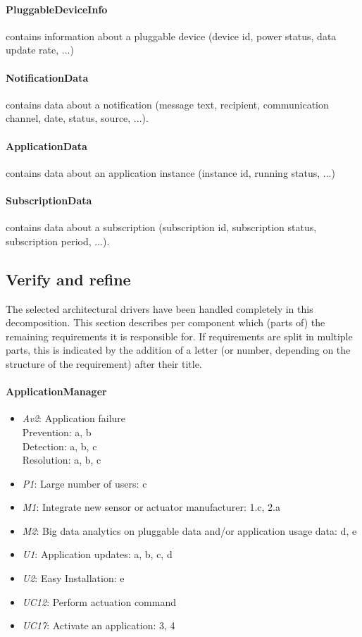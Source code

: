     \paragraph{PluggableDeviceInfo}
               contains information about a pluggable device (device id,
               power status, data update rate, ...)
    \paragraph{NotificationData}
               contains data about a notification (message text, recipient,
               communication channel, date, status, source, ...).
    \paragraph{ApplicationData}
               contains data about an application instance (instance id, running status, ...)
    \paragraph{SubscriptionData}
               contains data about a subscription (subscription id, subscription status,
               subscription period, ...).


\subsection{Verify and refine}
    \noindent The selected architectural drivers have been handled completely
    in this decomposition.
    This section describes per component which (parts of) the remaining
    requirements it is responsible for. If requirements are split in
    multiple parts, this is indicated by the addition of a letter
    (or number, depending on the structure of the requirement) after their title.

    \paragraph{ApplicationManager}
        \begin{itemize}
            \item \emph{Av2}: Application failure \\
                   Prevention: a, b \\
                   Detection: a, b, c \\
                   Resolution: a, b, c
           \item \emph{P1}: Large number of users: c
           \item \emph{M1}: Integrate new sensor or actuator manufacturer: 1.c, 2.a
           \item \emph{M2}: Big data analytics on pluggable data and/or application usage data: d, e
           \item \emph{U1}: Application updates: a, b, c, d
           \item \emph{U2}: Easy Installation: e
           \item \emph{UC12}: Perform actuation command
           \item \emph{UC17}: Activate an application: 3, 4
        \end{itemize}

